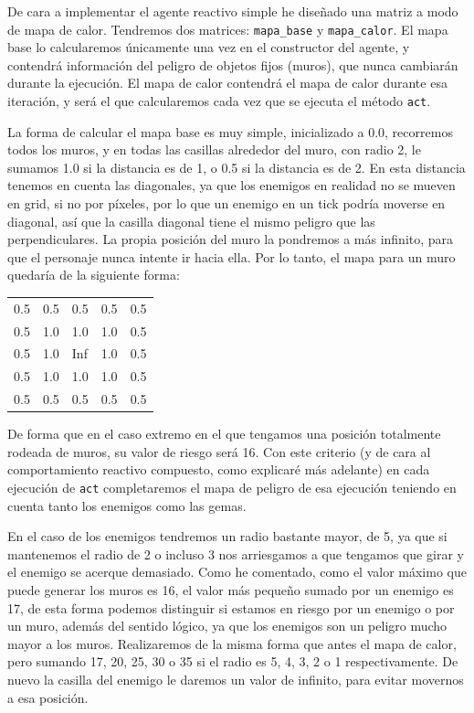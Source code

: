 \documentclass[10pt, spanish]{article}
\begin{document}
De cara a implementar el agente reactivo simple he diseñado una matriz a modo de mapa de calor. Tendremos dos matrices: \texttt{mapa\_base} y \texttt{mapa\_calor}. El mapa base lo calcularemos únicamente una vez en el constructor del agente, y contendrá información del peligro de objetos fijos (muros), que nunca cambiarán durante la ejecución. El mapa de calor contendrá el mapa de calor durante esa iteración, y será el que calcularemos cada vez que se ejecuta el método \texttt{act}.

La forma de calcular el mapa base es muy simple, inicializado a 0.0, recorremos todos los muros, y en todas las casillas alrededor del muro, con radio 2, le sumamos 1.0 si la distancia es de 1, o 0.5 si la distancia es de 2. En esta distancia tenemos en cuenta las diagonales, ya que los enemigos en realidad no se mueven en grid, si no por píxeles, por lo que un enemigo en un tick podría moverse en diagonal, así que la casilla diagonal tiene el mismo peligro que las perpendiculares. La propia posición del muro la pondremos a más infinito, para que el personaje nunca intente ir hacia ella. Por lo tanto, el mapa para un muro quedaría de la siguiente forma:

\vspace{-0.4cm}

\begin{table}[H]
\centering

\begin{tabular}{lllll}
0.5 & 0.5 & 0.5 & 0.5 & 0.5                     \\
0.5 & 1.0 & 1.0 & 1.0 & 0.5                     \\
0.5 & 1.0 & Inf    & 1.0 & 0.5                     \\
0.5 & 1.0 & 1.0 & 1.0 & 0.5                     \\
0.5 & 0.5 & 0.5 & 0.5 & \multicolumn{1}{c}{0.5}
\end{tabular}
\end{table}

\vspace{-0.5cm}

De forma que en el caso extremo en el que tengamos una posición totalmente rodeada de muros, su valor de riesgo será 16. Con este criterio (y de cara al comportamiento reactivo compuesto, como explicaré más adelante) en cada ejecución de \texttt{act} completaremos el mapa de peligro de esa ejecución teniendo en cuenta tanto los enemigos como las gemas.


En el caso de los enemigos tendremos un radio bastante mayor, de 5, ya que si mantenemos el radio de 2 o incluso 3 nos arriesgamos a que tengamos que girar y el enemigo se acerque demasiado. Como he comentado, como el valor máximo que puede generar los muros es 16, el valor más pequeño sumado por un enemigo es 17, de esta forma podemos distinguir si estamos en riesgo por un enemigo o por un muro, además del sentido lógico, ya que los enemigos son un peligro mucho mayor a los muros. Realizaremos de la misma forma que antes el mapa de calor, pero sumando 17, 20, 25, 30 o 35 si el radio es 5, 4, 3, 2 o 1 respectivamente. De nuevo la casilla del enemigo le daremos un valor de infinito, para evitar movernos a esa posición.
\end{document}
